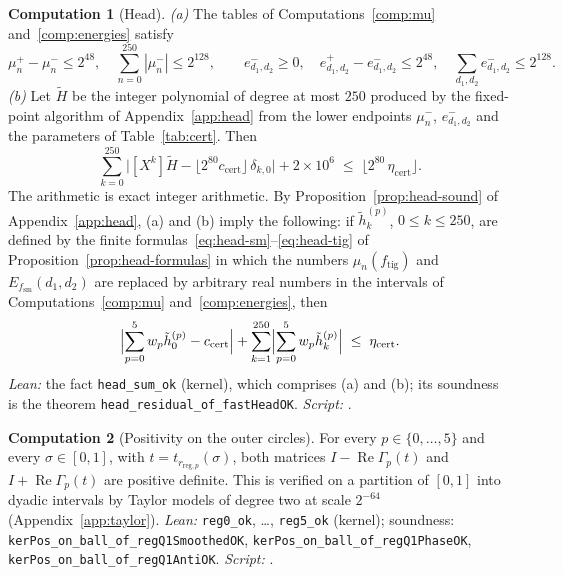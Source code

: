 \documentclass[11pt,reqno]{amsart}
\theoremstyle{definition}
\newtheorem{computation}{Computation}
\numberwithin{equation}{section}
\newcommand{\ftig}{f_{\mathrm{tig}}}
\newcommand{\fsm}{f_{\mathrm{sm}}}
\newcommand{\ccert}{c_{\mathrm{cert}}}
\DeclareMathOperator{\RePart}{Re}
\begin{document}
\begin{computation}[Head]\label{comp:head}
\emph{(a)} The tables of Computations~\ref{comp:mu} and~\ref{comp:energies} satisfy
\[
  \mu_n^+-\mu_n^-\le2^{48},\quad\sum_{n=0}^{250}|\mu_n^-|\le2^{128},\qquad
  e^-_{d_1,d_2}\ge0,\quad e^+_{d_1,d_2}-e^-_{d_1,d_2}\le2^{48},\quad\sum_{d_1,d_2}e^-_{d_1,d_2}\le2^{128} .
\]
\emph{(b)} Let $\widetilde H$ be the integer polynomial of degree at most $250$ produced by the fixed-point algorithm of Appendix~\ref{app:head} from the lower endpoints $\mu_n^-$, $e^-_{d_1,d_2}$ and the parameters of Table~\ref{tab:cert}. Then
\begin{equation}\label{eq:head-int}
  \sum_{k=0}^{250}\bigl|[X^k]\widetilde H-\lfloor2^{80}\ccert\rfloor\,\delta_{k,0}\bigr|+2\times10^6\;\le\;\lfloor2^{80}\,\eta_{\mathrm{cert}}\rfloor .
\end{equation}
The arithmetic is exact integer arithmetic. By Proposition~\ref{prop:head-sound} of Appendix~\ref{app:head}, (a) and (b) imply the following: if $\tilde h^{(p)}_k$, $0\le k\le250$, are defined by the finite formulas~\eqref{eq:head-sm}--\eqref{eq:head-tig} of Proposition~\ref{prop:head-formulas} in which the numbers $\mu_n(\ftig)$ and $E_{\fsm}(d_1,d_2)$ are replaced by arbitrary real numbers in the intervals of Computations~\ref{comp:mu} and~\ref{comp:energies}, then
\begin{equation}\label{eq:head-all}
  \Bigl|\sum_{p=0}^5w_p\tilde h^{(p)}_0-\ccert\Bigr|+\sum_{k=1}^{250}\Bigl|\sum_{p=0}^5w_p\tilde h^{(p)}_k\Bigr|\;\le\;\eta_{\mathrm{cert}} .
\end{equation}
\emph{Lean:} the fact \texttt{head\_sum\_ok} (kernel), which comprises (a) and (b); its soundness is the theorem \texttt{head\_residual\_of\_fastHeadOK}. \emph{Script:} .
\end{computation}

\begin{computation}[Positivity on the outer circles]\label{comp:reg}
For every $p\in\{0,\dots,5\}$ and every $\sigma\in[0,1]$, with $t=t_{r_{\mathrm{reg},p}}(\sigma)$, both matrices $I-\RePart\Gamma_p(t)$ and $I+\RePart\Gamma_p(t)$ are positive definite. This is verified on a partition of $[0,1]$ into dyadic intervals by Taylor models of degree two at scale $2^{-64}$ (Appendix~\ref{app:taylor}). \emph{Lean:} \texttt{reg0\_ok}, \dots, \texttt{reg5\_ok} (kernel); soundness: \texttt{kerPos\_on\_ball\_of\_regQ1SmoothedOK}, \texttt{kerPos\_on\_ball\_of\_regQ1PhaseOK}, \texttt{kerPos\_on\_ball\_of\_regQ1AntiOK}. \emph{Script:} .
\end{computation}
\end{document}
